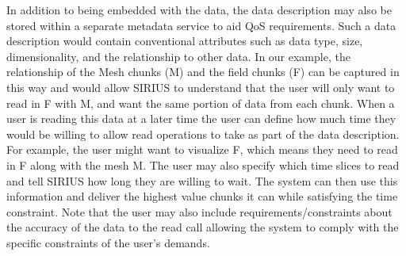 
 
In addition to being embedded with the data, the data description may also be stored within 
a separate metadata service to aid QoS requirements. Such a data description would contain
conventional attributes such as data type, size, dimensionality, and the relationship to other 
data. In our example, the relationship of the Mesh chunks (M) and the field chunks (F) can 
be captured in this way and would allow SIRIUS to understand that the user will only 
want to read in F with M, and want the same portion of data from each chunk. 
%
When a user is reading this data at a later time the user can define how much time they would 
be willing to allow read operations to take as part of the data description. For example, 
the user might want to visualize F, which means they need to read in F along with the mesh 
M. The user may also specify which time slices to read and tell SIRIUS how long they 
are willing to wait. The system can then use this information and deliver the highest value 
chunks it can while satisfying the time constraint.  Note that the user may also include 
requirements/constraints about the accuracy of the data to the read call
allowing the system to comply with the specific constraints of the user's demands.


